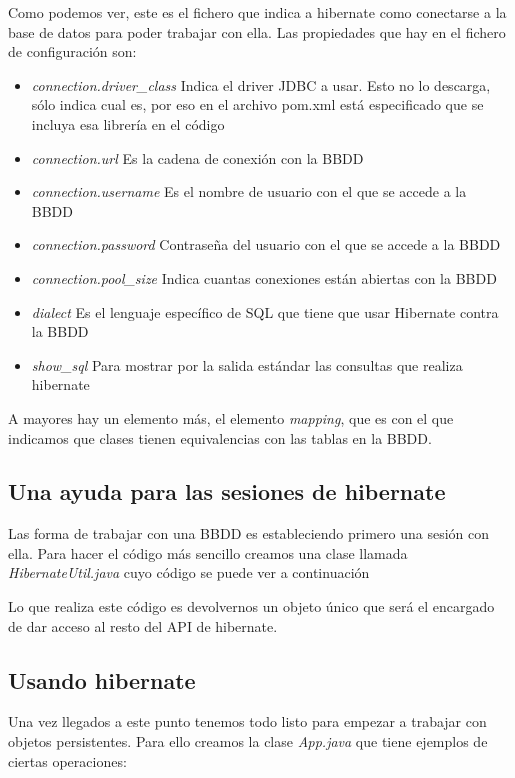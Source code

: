 \documentclass{article}
\begin{document}
	Como podemos ver, este es el fichero que indica a hibernate como conectarse a la base de datos para poder trabajar con ella. Las propiedades que hay en el fichero de configuración son:
{\setlength{\parskip}{0mm}
\begin{itemize}
	\item \emph{connection.driver\_class} Indica el driver JDBC a usar. Esto no lo descarga, sólo indica cual es, por eso en el archivo pom.xml está especificado que se incluya esa librería en el código
	\item \emph{connection.url} Es la cadena de conexión con la BBDD
	\item \emph{connection.username} Es el nombre de usuario con el que se accede a la BBDD
	\item \emph{connection.password} Contraseña del usuario con el que se accede a la BBDD
	\item \emph{connection.pool\_size} Indica cuantas conexiones están abiertas con la BBDD
	\item \emph{dialect} Es el lenguaje específico de SQL que tiene que usar Hibernate contra la BBDD
	\item \emph{show\_sql} Para mostrar por la salida estándar las consultas que realiza hibernate 
\end{itemize}
}

	A mayores hay un elemento más, el elemento \emph{mapping}, que es con el que indicamos que clases tienen equivalencias con las tablas en la BBDD.

\subsection{Una ayuda para las sesiones de hibernate}
	Las forma de trabajar con una BBDD es estableciendo primero una sesión con ella. Para hacer el código más sencillo creamos una clase llamada \emph{HibernateUtil.java} cuyo código se puede ver a continuación


	Lo que realiza este código es devolvernos un objeto único que será el encargado de dar acceso al resto del API de hibernate.
	
\subsection{Usando hibernate}
	Una vez llegados a este punto tenemos todo listo para empezar a trabajar con objetos persistentes. Para ello creamos la clase \emph{App.java} que tiene ejemplos de ciertas operaciones:

\end{document}
